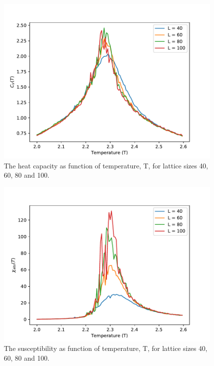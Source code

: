 \documentclass[12pt,english,a4paper]{article}
\begin{document}
\begin{figure}[H]
    \centering
    \includegraphics[scale=0.7]{Figures/Cv_of_T_N_1000000000.pdf}
    \caption{The heat capacity as function of temperature, T, for lattice sizes 40, 60, 80 and 100.}
    \label{fig:Cv_of_T}
\end{figure}
\begin{figure}[H]
    \centering
    \includegraphics[scale=0.7]{Figures/X_of_T_N_1000000000.pdf}
    \caption{The susceptibility as function of temperature, T, for lattice sizes 40, 60, 80 and 100.}
    \label{fig:X_of_T}
\end{figure}


\printbibliography
\end{document}
